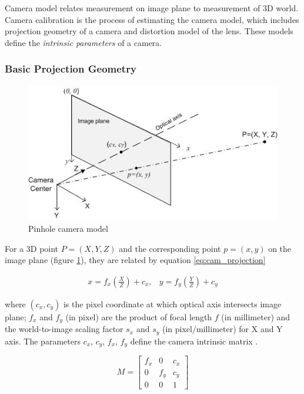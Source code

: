 Camera model relates measurement on image plane to measurement of
3D world. Camera calibration is the process of estimating the camera
model, which includes projection geometry of a camera and distortion
model of the lens. These models define the \textit{intrinsic
  parameters} of a camera.

\subsubsection{Basic Projection Geometry}
\begin{figure}[h]
\centering
\includegraphics[width=12cm, keepaspectratio=true]{./Figures/camera_model.jpg}
\caption{Pinhole camera model}
\label{figch2:cammodel}
\end{figure}

For a 3D point $P=(X, Y, Z)$ and the corresponding point
$p=(x, y)$ on the image plane (figure
\ref{figch2:cammodel}), they are related by equation \ref{eq:cam_projection}
\cite{bradski_learning_2008}

\begin{equation}
\label{eq:cam_projection}
\begin{matrix}
x = f_x\left(\frac{X}{Z}\right)+c_x, &
y=f_y\left(\frac{Y}{Z}\right)+c_y
\end{matrix}
\end{equation}

\noindent where $(c_x, c_y)$ is the pixel coordinate at which optical
axis intersects image plane; $f_x$ and $f_y$ (in pixel) are the product
of focal length $f$ (in millimeter) and the world-to-image scaling
factor $s_x$ and $s_y$ (in pixel/millimeter) for X and Y axis. The
parameters $c_x$, $c_y$, $f_x$, $f_y$ define the camera intrinsic
matrix \cite{bradski_learning_2008} \cite{heikkila_four-step_1997}.

\begin{equation}
M = \begin{bmatrix}
f_x & 0 & c_x \\
0& f_y & c_y \\
0 & 0 & 1 \end{bmatrix}
\end{equation}

